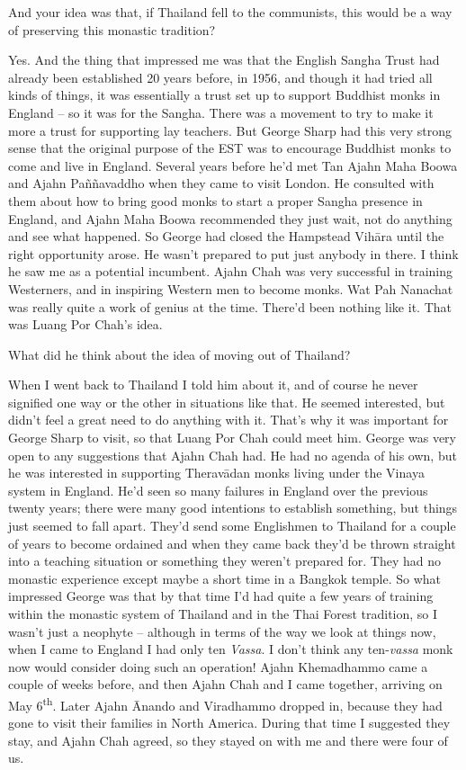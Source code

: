 \question{}
And your idea was that, if Thailand fell to the communists, this
would be a way of preserving this monastic tradition? 

\answer{}
Yes. And the thing that impressed me was that the English
Sangha Trust had already been established 20 years before, in 1956, and
though it had tried all kinds of things, it was essentially a trust set
up to support Buddhist monks in England -- so it was for the Sangha.
There was a movement to try to make it more a trust for supporting lay
teachers. But George Sharp had this very strong sense that the original
purpose of the EST was to encourage Buddhist monks to come and live in
England. Several years before he'd met Tan Ajahn Maha Boowa and Ajahn
Paññavaddho when they came to visit London. He consulted with them about
how to bring good monks to start a proper Sangha presence in England, 
and Ajahn Maha Boowa recommended they just wait, not do anything and see
what happened. So George had closed the Hampstead Vihāra until the right
opportunity arose. He wasn't prepared to put just anybody in there. I
think he saw me as a potential incumbent. Ajahn Chah was very successful
in training Westerners, and in inspiring Western men to become monks. 
Wat Pah Nanachat was really quite a work of genius at the time. There'd
been nothing like it. That was Luang Por Chah's idea. 

\question{}
What did he think about the idea of moving out of Thailand?

\answer{}
When I went back to Thailand I told him about it, and of
course he never signified one way or the other in situations like that. 
He seemed interested, but didn't feel a great need to do anything with
it. That's why it was important for George Sharp to visit, so that Luang
Por Chah could meet him. George was very open to any suggestions that
Ajahn Chah had. He had no agenda of his own, but he was interested in
supporting Theravādan monks living under the Vinaya system in England. 
He'd seen so many failures in England over the previous twenty years; 
there were many good intentions to establish something, but things just
seemed to fall apart. They'd send some Englishmen to Thailand for a
couple of years to become ordained and when they came back they'd be
thrown straight into a teaching situation or something they weren't
prepared for. They had no monastic experience except maybe a short time
in a Bangkok temple. So what impressed George was that by that time I'd
had quite a few years of training within the monastic system of Thailand
and in the Thai Forest tradition, so I wasn't just a neophyte --
although in terms of the way we look at things now, when I came to
England I had only ten \emph{Vassa}. I don't think any ten-\emph{vassa}
monk now would consider doing such an operation! Ajahn Khemadhammo came
a couple of weeks before, and then Ajahn Chah and I came together, 
arriving on May 6\textsuperscript{th}. Later Ajahn Ānando and Viradhammo dropped in, 
because they had gone to visit their families in North America. During
that time I suggested they stay, and Ajahn Chah agreed, so they stayed
on with me and there were four of us. 

